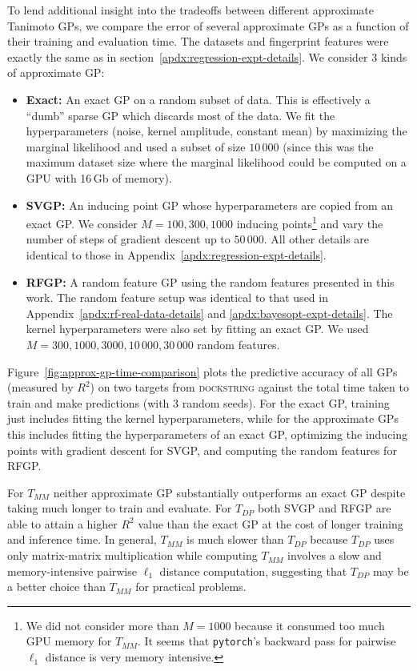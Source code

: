\documentclass{article}
\theoremstyle{plain}
\theoremstyle{definition}
\theoremstyle{remark}
\begin{document}
To lend additional insight into the tradeoffs between different approximate Tanimoto GPs,
we compare the error of several approximate GPs as a function of their training and evaluation time.
The datasets and fingerprint features were exactly the same as in
section~\ref{apdx:regression-expt-details}.
We consider 3 kinds of approximate GP:
\begin{itemize}
    \item \textbf{Exact:} An exact GP on a random subset of data. This is effectively a ``dumb'' sparse GP which discards most of the data.
    We fit the hyperparameters (noise, kernel amplitude, constant mean) by maximizing the marginal likelihood
    and used a subset of size $10\,000$
    (since this was the maximum dataset size where the marginal likelihood could be computed on a GPU with 16\,Gb of memory).
    \item \textbf{SVGP:} An inducing point GP \citep{hensman2013gaussian}
    whose hyperparameters are copied from an exact GP.
    We consider $M=100,300,1000$ inducing points\footnote{
    We did not consider more than $M=1000$ because it consumed
    too much GPU memory for $T_{MM}$.
    It seems that \texttt{pytorch}'s backward pass for pairwise $\ell_1$
    distance is very memory intensive.
    }
    and vary the number of steps of gradient descent up to $50\,000$.
    All other details are identical to those in Appendix~\ref{apdx:regression-expt-details}.
    \item \textbf{RFGP:} A random feature GP using the random features presented in this work.
    The random feature setup was identical to that used in
    Appendix~\ref{apdx:rf-real-data-details} and \ref{apdx:bayesopt-expt-details}.
    The kernel hyperparameters were also set by fitting an exact GP.
    We used $M=300,1000,3000,10\,000,30\,000$ random features.
\end{itemize}
Figure~\ref{fig:approx-gp-time-comparison} plots the predictive accuracy
of all GPs (measured by $R^2$)
on two targets from \textsc{dockstring} \citep{garcia2022dockstring}
against the total time taken to train and make predictions (with 3 random seeds).
For the exact GP, training just includes fitting the kernel hyperparameters,
while for the approximate GPs this includes fitting the hyperparameters of an exact GP, optimizing the inducing points with gradient descent for SVGP,
and computing the random features for RFGP.

For $T_{MM}$ neither approximate GP substantially outperforms an exact GP
despite taking much longer to train and evaluate.
For $T_{DP}$ both SVGP and RFGP are able to attain a higher $R^2$ value
than the exact GP at the cost of longer training and inference time.
In general, $T_{MM}$ is much slower than $T_{DP}$ because $T_{DP}$
uses only matrix-matrix multiplication while computing $T_{MM}$
involves a slow and memory-intensive pairwise $\ell_1$ distance computation,
suggesting that $T_{DP}$ may be a better choice than $T_{MM}$
for practical problems.
\end{document}
